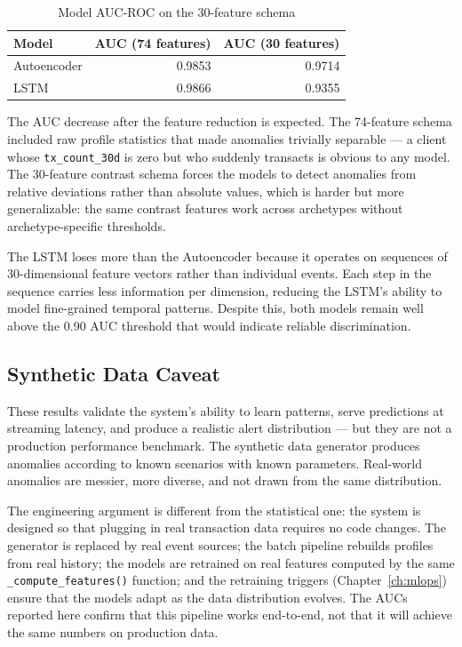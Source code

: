 \begin{table}[H]
\centering
\caption{Model AUC-ROC on the 30-feature schema}
\label{tab:model-auc}
\begin{tabular}{@{}lrr@{}}
\toprule
\textbf{Model} & \textbf{AUC (74 features)} & \textbf{AUC (30 features)} \\
\midrule
Autoencoder & 0.9853 & 0.9714 \\
LSTM        & 0.9866 & 0.9355 \\
\bottomrule
\end{tabular}
\end{table}

The AUC decrease after the feature reduction is expected. The 74-feature
schema included raw profile statistics that made anomalies trivially
separable --- a client whose \texttt{tx\_count\_30d} is zero but who
suddenly transacts is obvious to any model. The 30-feature contrast schema
forces the models to detect anomalies from relative deviations rather than
absolute values, which is harder but more generalizable: the same contrast
features work across archetypes without archetype-specific thresholds.

The LSTM loses more than the Autoencoder because it operates on sequences
of 30-dimensional feature vectors rather than individual events. Each step
in the sequence carries less information per dimension, reducing the LSTM's
ability to model fine-grained temporal patterns. Despite this, both models
remain well above the 0.90 AUC threshold that would indicate reliable
discrimination.

\subsection{Synthetic Data Caveat}

These results validate the system's ability to learn patterns, serve
predictions at streaming latency, and produce a realistic alert
distribution --- but they are not a production performance benchmark. The
synthetic data generator produces anomalies according to known scenarios
with known parameters. Real-world anomalies are messier, more diverse,
and not drawn from the same distribution.

The engineering argument is different from the statistical one: the system
is designed so that plugging in real transaction data requires no code
changes. The generator is replaced by real event sources; the batch
pipeline rebuilds profiles from real history; the models are retrained on
real features computed by the same \texttt{\_compute\_features()} function;
and the retraining triggers (Chapter~\ref{ch:mlops}) ensure that the
models adapt as the data distribution evolves. The AUCs reported here
confirm that this pipeline works end-to-end, not that it will achieve the
same numbers on production data.

